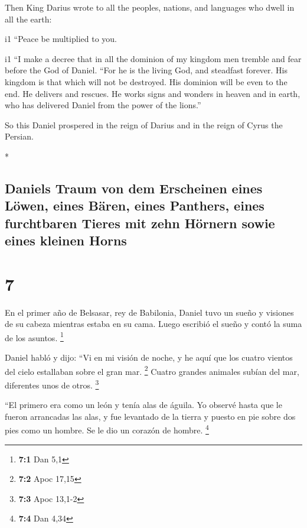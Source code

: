 \begin{paracol}{2}
\begin{otherlanguage}{english}
 Then King Darius wrote to all the peoples, nations, and
languages who dwell in all the earth:

i1 ``Peace be multiplied to you.

i1  ``I make a decree that in all the dominion of my
kingdom men tremble and fear before the God of Daniel. ``For he is the
living God, and steadfast forever. His kingdom is that which will not be
destroyed. His dominion will be even to the end.  He
delivers and rescues. He works signs and wonders in heaven and in earth,
who has delivered Daniel from the power of the lions.''

 So this Daniel prospered in the reign of Darius and in
the reign of Cyrus the Persian.

\end{otherlanguage}

\switchcolumn[0]*

\hypertarget{daniels-traum-von-dem-erscheinen-eines-luxf6wen-eines-buxe4ren-eines-panthers-eines-furchtbaren-tieres-mit-zehn-huxf6rnern-sowie-eines-kleinen-horns}{%
\subsection{Daniels Traum von dem Erscheinen eines Löwen, eines Bären,
eines Panthers, eines furchtbaren Tieres mit zehn Hörnern sowie eines
kleinen
Horns}\label{daniels-traum-von-dem-erscheinen-eines-luxf6wen-eines-buxe4ren-eines-panthers-eines-furchtbaren-tieres-mit-zehn-huxf6rnern-sowie-eines-kleinen-horns}}

\hypertarget{section-12}{%
\section{7}\label{section-12}}

 En el primer año de Belsasar, rey de Babilonia, Daniel
tuvo un sueño y visiones de su cabeza mientras estaba en su cama. Luego
escribió el sueño y contó la suma de los asuntos. \footnote{\textbf{7:1}
  Dan 5,1}

 Daniel habló y dijo: ``Vi en mi visión de noche, y he
aquí que los cuatro vientos del cielo estallaban sobre el gran mar.
\footnote{\textbf{7:2} Apoc 17,15}  Cuatro grandes
animales subían del mar, diferentes unos de otros. \footnote{\textbf{7:3}
  Apoc 13,1-2}

 ``El primero era como un león y tenía alas de águila. Yo
observé hasta que le fueron arrancadas las alas, y fue levantado de la
tierra y puesto en pie sobre dos pies como un hombre. Se le dio un
corazón de hombre. \footnote{\textbf{7:4} Dan 4,34}


\end{paracol}
